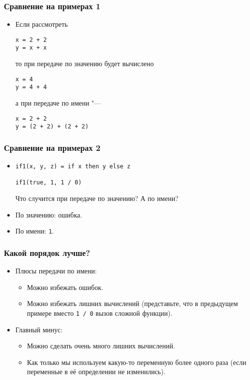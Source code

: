 \documentclass[11pt]{beamer}
\begin{document}
\begin{frame}[fragile]
\frametitle{Сравнение на примерах 1}
\begin{itemize}
    \item Если рассмотреть
\begin{lstlisting}
x = 2 + 2
y = x + x
\end{lstlisting}
    то при передаче по значению будет вычислено \pause
\begin{lstlisting}
x = 4
y = 4 + 4
\end{lstlisting}
    а при передаче по имени "--- \pause
\begin{lstlisting}
x = 2 + 2
y = (2 + 2) + (2 + 2)
\end{lstlisting}
\end{itemize}
\end{frame}

\begin{frame}[fragile]
\frametitle{Сравнение на примерах 2}
\begin{itemize}
    \item 
\begin{lstlisting}
if1(x, y, z) = if x then y else z

if1(true, 1, 1 / 0)
\end{lstlisting}
    Что случится при передаче по значению? А по имени? 
    \pause
    \item По значению: ошибка.
    \pause
    \item По имени: \lstinline|1|.
\end{itemize}
\end{frame}

\begin{frame}[fragile]
\frametitle{Какой порядок лучше?}
\begin{itemize}
    \item Плюсы передачи по имени:
    \pause
    \begin{itemize}
        \item Можно избежать ошибок.
        \item Можно избежать лишних вычислений
        \pause (представьте, что в предыдущем примере вместо \lstinline|1 / 0| вызов сложной функции).
    \end{itemize}
    \pause
    \item Главный минус:
    \pause
    \begin{itemize}
        \item Можно сделать очень много лишних вычислений.
        \pause 
        \item Как только мы используем какую-то переменную более одного раза
        \pause (если переменные в её определении не изменились).
    \end{itemize}
\end{itemize}
\end{frame}
\end{document}
